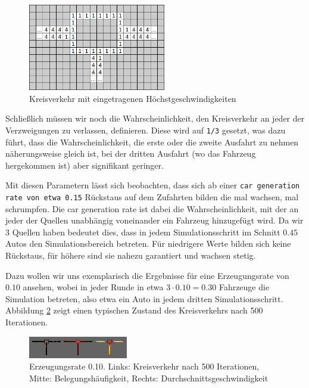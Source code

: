 \documentclass[10pt, a4paper]{article}
\begin{document}
\begin{figure}[h!]
	\centering
	\includegraphics[width=6cm]{img/roundaboutSmall}
	\caption{Kreisverkehr mit eingetragenen Höchstgeschwindigkeiten}
	\label{fig:roundaboutSmall}
\end{figure}

Schließlich müssen wir noch die Wahrscheinlichkeit, den Kreisverkehr an jeder der Verzweigungen zu verlassen, definieren. Diese wird auf \texttt{1/3} gesetzt, was dazu führt, dass die Wahrscheinlichkeit, die erste oder die zweite Ausfahrt zu nehmen näherungsweise gleich ist, bei der dritten Ausfahrt (wo das Fahrzeug hergekommen ist) aber signifikant geringer.

Mit diesen Parametern lässt sich beobachten, dass sich ab einer \texttt{car generation rate von etwa 0.15} Rückstaus auf dem Zufahrten bilden die mal wachsen, mal schrumpfen. Die car generation rate ist dabei die Wahrscheinlichkeit, mit der an jeder der Quellen unabhängig voneinander ein Fahrzeug hinzugefügt wird. Da wir 3 Quellen haben bedeutet dies, dass in jedem Simulationsschritt im Schnitt $0.45$ Autos den Simulationsbereich betreten. Für niedrigere Werte bilden sich keine Rückstaus, für höhere sind sie nahezu garantiert und wachsen stetig.

Dazu wollen wir uns exemplarisch die Ergebnisse für eine Erzeugungsrate von $0.10$ ansehen, wobei in jeder Runde in etwa $3 \cdot 0.10 = 0.30$ Fahrzeuge die Simulation betreten, also etwa ein Auto in jedem dritten Simulationsschritt. Abbildung \ref{fig:roundabout010} zeigt einen typischen Zustand des Kreisverkehrs nach 500 Iterationen.

\begin{figure}[h!]
	\centering
	\includegraphics[width=\textwidth]{img/roundabout_010}
	\caption{Erzeugungsrate 0.10. Links: Kreisverkehr nach 500 Iterationen, Mitte: Belegungshäufigkeit, Rechts: Durchschnittsgeschwindigkeit}
	\label{fig:roundabout010}
\end{figure}
\end{document}

